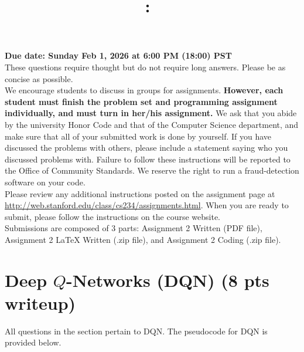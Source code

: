 \documentclass{article}
\title{
\vspace{-1in}
\textmd{\textbf{\hmwkClass:\ \hmwkTitle}}}
\author{}
\date{} %
\begin{document}
\maketitle
\vspace{-.5in}
\begin{framed}
{\bf Due date: Sunday Feb 1, 2026 at 6:00 PM (18:00) PST}
\\[1em]
These questions require thought but do not require long answers. Please be as concise as possible.
\\[1em]
We encourage students to discuss in groups for assignments. \textbf{However, each student must finish the
problem set and programming assignment individually, and must turn in her/his assignment.} We ask
that you abide by the university Honor Code and that of the Computer Science department, and make
sure that all of your submitted work is done by yourself. If you have discussed the problems with others,
please include a statement saying who you discussed problems with. Failure to follow these instructions
will be reported to the Office of Community Standards. We reserve the right to run a fraud-detection software on your code.
\\[1em]
Please review any additional instructions posted on the assignment page at
\href{http://web.stanford.edu/class/cs234/assignments.html}{http://web.stanford.edu/class/cs234/assignments.html}. When you are ready to submit, please
follow the instructions on the course website. 
\\[1em]
Submissions are composed of 3 parts: Assignment 2 Written (PDF file), Assignment 2 LaTeX Written (.zip file), and Assignment 2 Coding (.zip file). 
\end{framed}

\section{Deep $Q$-Networks (DQN) (8 pts writeup)}

All questions in the section pertain to DQN. The pseudocode for DQN is provided below.
\end{document}
